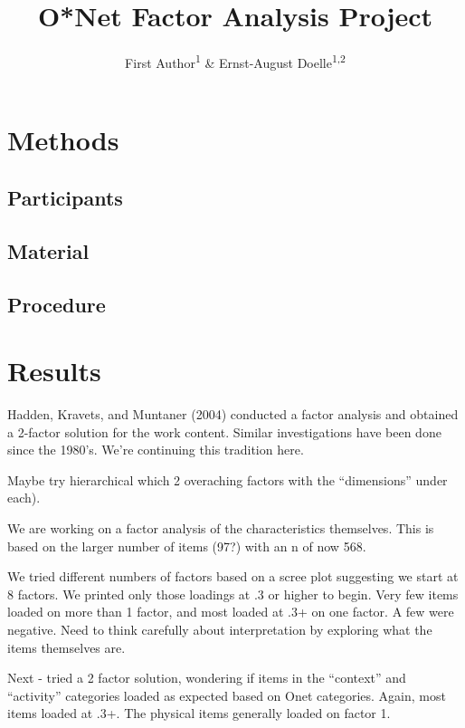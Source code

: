 \documentclass[
  english,
  man]{apa6}
\title{O*Net Factor Analysis Project}
\author{First Author\textsuperscript{1} \& Ernst-August Doelle\textsuperscript{1,2}}
\date{}
\affiliation{\vspace{0.5cm}\textsuperscript{1} Wilhelm-Wundt-University\\\textsuperscript{2} Konstanz Business School}
\begin{document}
\maketitle

\hypertarget{methods}{%
\section{Methods}\label{methods}}

\hypertarget{participants}{%
\subsection{Participants}\label{participants}}

\hypertarget{material}{%
\subsection{Material}\label{material}}

\hypertarget{procedure}{%
\subsection{Procedure}\label{procedure}}

\hypertarget{results}{%
\section{Results}\label{results}}

Hadden, Kravets, and Muntaner (2004) conducted a factor analysis and obtained a 2-factor solution for the work content. Similar investigations have been done since the 1980's. We're continuing this tradition here.

Maybe try hierarchical which 2 overaching factors with the ``dimensions'' under each).

We are working on a factor analysis of the characteristics themselves. This is based on the larger number of items (97?) with an n of now 568.

We tried different numbers of factors based on a scree plot suggesting we start at 8 factors. We printed only those loadings at .3 or higher to begin. Very few items loaded on more than 1 factor, and most loaded at .3+ on one factor. A few were negative. Need to think carefully about interpretation by exploring what the items themselves are.

Next - tried a 2 factor solution, wondering if items in the ``context'' and ``activity'' categories loaded as expected based on Onet categories. Again, most items loaded at .3+. The physical items generally loaded on factor 1.
\end{document}
